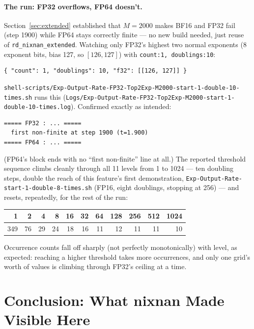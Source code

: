 \documentclass[11pt]{article}
\begin{document}
\paragraph{The run: FP32 overflows, FP64 doesn't.} Section~\ref{sec:extended}
established that $M{=}2000$ makes BF16 and FP32 fail (step 1900) while FP64 stays
correctly finite --- no new build needed, just reuse of \texttt{rd\_nixnan\_extended}.
Watching only FP32's highest two normal exponents (8 exponent bits, bias 127, so
$[126,127]$) with \texttt{count:1, doublings:10}:
\begin{lstlisting}
{ "count": 1, "doublings": 10, "f32": [[126, 127]] }
\end{lstlisting}
\texttt{shell-scripts/Exp-Output-Rate-FP32-Top2Exp-M2000-start-1-double-10-times.sh}
runs this (\texttt{Logs/Exp-Output-Rate-FP32-Top2Exp-M2000-start-1-double-10-times.log}).
Confirmed exactly as intended:
\begin{lstlisting}
===== FP32 : ... =====
  first non-finite at step 1900 (t=1.900)
===== FP64 : ... =====
\end{lstlisting}
(FP64's block ends with no ``first non-finite'' line at all.) The reported threshold
sequence climbs cleanly through all 11 levels from 1 to 1024 --- ten doubling steps,
double the reach of this feature's first demonstration,
\texttt{Exp-Output-Rate-start-1-double-8-times.sh} (FP16, eight doublings, stopping at
256) --- and resets, repeatedly, for the rest of the run:
\begin{center}
\begin{tabular}{rrrrrrrrrrr}
\toprule
1 & 2 & 4 & 8 & 16 & 32 & 64 & 128 & 256 & 512 & 1024 \\
\midrule
349 & 76 & 29 & 24 & 18 & 16 & 11 & 12 & 11 & 11 & 10 \\
\bottomrule
\end{tabular}
\end{center}
Occurrence counts fall off sharply (not perfectly monotonically) with level, as
expected: reaching a higher threshold takes more occurrences, and only one grid's
worth of values is climbing through FP32's ceiling at a time.

\section{Conclusion: What nixnan Made Visible Here}
\end{document}
